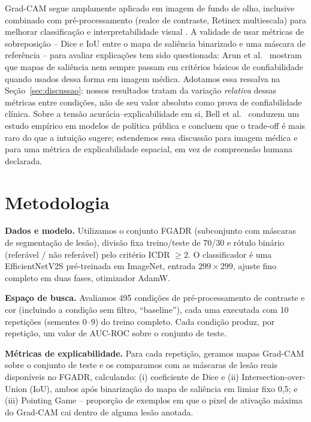\documentclass[12pt]{article}
\begin{document}
Grad-CAM \cite{selvaraju2017gradcam} segue amplamente aplicado em imagem de
fundo de olho, inclusive combinado com pré-processamento (realce de
contraste, Retinex multiescala) para melhorar classificação e
interpretabilidade visual \cite{dash2025ocular}. A validade de usar métricas
de sobreposição -- Dice e IoU entre o mapa de saliência binarizado e uma
máscara de referência -- para avaliar explicações tem sido questionada:
Arun et al.\ \cite{arun2021trustworthiness} mostram que mapas de saliência
nem sempre passam em critérios básicos de confiabilidade quando usados
dessa forma em imagem médica. Adotamos essa ressalva na
Seção~\ref{sec:discussao}: nossos resultados tratam da variação
\emph{relativa} dessas métricas entre condições, não de seu valor absoluto
como prova de confiabilidade clínica. Sobre a tensão
acurácia--explicabilidade em si, Bell et al.\ \cite{bell2022justnotsimple}
conduzem um estudo empírico em modelos de política pública e concluem que o
trade-off é mais raro do que a intuição sugere; estendemos essa discussão
para imagem médica e para uma métrica de explicabilidade espacial, em vez de
compreensão humana declarada.

\section{Metodologia}

\textbf{Dados e modelo.} Utilizamos o conjunto FGADR (subconjunto com
máscaras de segmentação de lesão), divisão fixa treino/teste de 70/30 e
rótulo binário (referável / não referável) pelo critério ICDR $\geq 2$. O
classificador é uma EfficientNetV2S pré-treinada em ImageNet, entrada
$299\times299$, ajuste fino completo em duas fases, otimizador AdamW.

\textbf{Espaço de busca.} Avaliamos 495 condições de pré-processamento de
contraste e cor (incluindo a condição sem filtro, ``baseline''), cada uma
executada com 10 repetições (sementes 0--9) do treino completo. Cada
condição produz, por repetição, um valor de AUC-ROC sobre o conjunto de
teste.

\textbf{Métricas de explicabilidade.} Para cada repetição, geramos mapas
Grad-CAM sobre o conjunto de teste e os comparamos com as máscaras de lesão
reais disponíveis no FGADR, calculando: (i) coeficiente de Dice e (ii)
Intersection-over-Union (IoU), ambos após binarização do mapa de saliência
em limiar fixo 0,5; e (iii) Pointing Game -- proporção de exemplos em que o
pixel de ativação máxima do Grad-CAM cai dentro de alguma lesão anotada.
\end{document}
